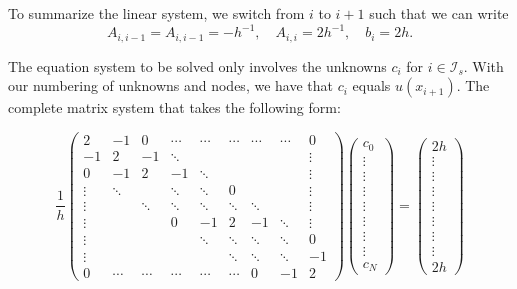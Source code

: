 \documentclass[../main.tex]{subfiles}
\begin{document}
		To summarize the linear system, we switch from $i$ to $i+1$ such that we can write
		$$
		A_{i, i-1}=A_{i, i-1}=-h^{-1}, \quad A_{i, i}=2 h^{-1}, \quad b_{i}=2 h .
		$$
		
		The equation system to be solved only involves the unknowns $c_{i}$ for $i \in \mathcal{I}_{s}$. With our numbering of unknowns and nodes, we have that $c_{i}$ equals $u\left(x_{i+1}\right)$. The complete matrix system that takes the following form:
		
		\begin{equation}
		\label{eqa172}
			\frac{1}{h}\left(\begin{array}{ccccccccc}
				2 & -1 & 0 & \cdots & \cdots & \cdots & \cdots & \cdots & 0 \\
				-1 & 2 & -1 & \ddots & & & & & \vdots \\
				0 & -1 & 2 & -1 & \ddots & & & & \vdots \\
				\vdots & \ddots & & \ddots & \ddots & 0 & & & \vdots \\
				\vdots & & \ddots & \ddots & \ddots & \ddots & \ddots & & \vdots \\
				\vdots & & & 0 & -1 & 2 & -1 & \ddots & \vdots \\
				\vdots & & & & \ddots & \ddots & \ddots & \ddots & 0 \\
				\vdots & & & & & \ddots & \ddots & \ddots & -1 \\
				0 & \cdots & \cdots & \cdots & \cdots & \cdots & 0 & -1 & 2
			\end{array}\right)\left(\begin{array}{c}
				c_{0} \\
				\vdots \\
				\vdots \\
				\vdots \\
				\vdots \\
				\vdots \\
				\vdots \\
				\vdots \\
				c_{N}
			\end{array}\right)=\left(\begin{array}{c}
				2 h \\
				\vdots \\
				\vdots \\
				\vdots \\
				\vdots \\
				\vdots \\
				\vdots \\
				\vdots \\
				2 h
			\end{array}\right)
		\end{equation}
	
\end{document}
